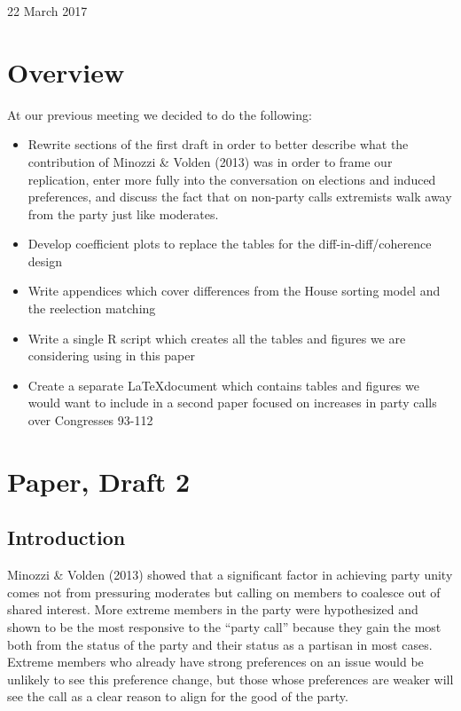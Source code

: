 \documentclass[12pt]{article}
\begin{document}
	
\begin{center}
	\Large 22 March 2017
\end{center}

\section{Overview}

At our previous meeting we decided to do the following:
\begin{itemize}
	\item Rewrite sections of the first draft in order to better describe what the contribution of Minozzi \& Volden (2013) was in order to frame our replication, enter more fully into the conversation on elections and induced preferences, and discuss the fact that on non-party calls extremists walk away from the party just like moderates.
	
	\item Develop coefficient plots to replace the tables for the diff-in-diff/coherence design
	
	\item Write appendices which cover differences from the House sorting model and the reelection matching
	
	\item Write a single R script which creates all the tables and figures we are considering using in this paper
	
	\item Create a separate \LaTeX document which contains tables and figures we would want to include in a second paper focused on increases in party calls over Congresses 93-112
\end{itemize}



\pagebreak

\section{Paper, Draft 2}

\subsection{Introduction}

Minozzi \& Volden (2013) showed that a significant factor in achieving party unity comes not from pressuring moderates but calling on members to coalesce out of shared interest. More extreme members in the party were hypothesized and shown to be the most responsive to the ``party call'' because they gain the most both from the status of the party and their status as a partisan in most cases. Extreme members who already have strong preferences on an issue would be unlikely to see this preference change, but those whose preferences are weaker will see the call as a clear reason to align for the good of the party.
\end{document}
